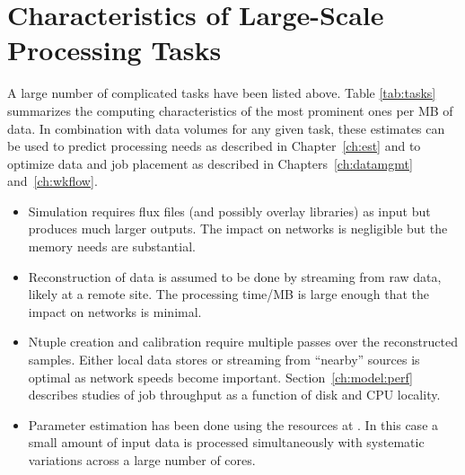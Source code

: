 \documentclass[../main-v1.tex]{subfiles}
\begin{document}

\section{Characteristics of Large-Scale Processing Tasks}

A large number of complicated tasks have been listed above.  Table \ref{tab:tasks} summarizes the computing characteristics of the most prominent ones per MB of data. In combination with data volumes for any given task, these estimates can be used to predict processing needs as described in Chapter~\ref{ch:est} and to optimize data and job placement as described in Chapters~\ref{ch:datamgmt} and~\ref{ch:wkflow}. 

\begin{itemize}
    \item Simulation requires flux files (and possibly overlay libraries) as input but produces much larger outputs. The impact on networks is negligible but the memory needs are substantial.
    \item Reconstruction of data is assumed to be done by streaming from raw data, likely at a remote site. The processing time/MB is large enough that the impact on networks is minimal. 
    \item Ntuple creation and calibration require multiple passes over the reconstructed samples. Either local data stores or streaming from ``nearby'' sources is optimal as network speeds become important. Section~\ref{ch:model:perf} describes studies of job throughput as a function of disk and CPU locality. 
    \item Parameter estimation has been done using the  resources at .  In this case a small amount of input data is processed simultaneously with systematic variations across a large number of cores. 

\end{itemize}
\end{document}
